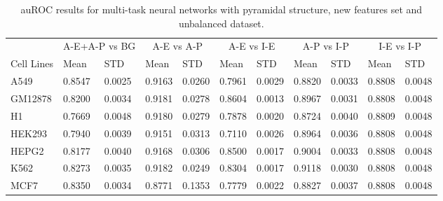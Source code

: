 \begin{table}[!htbp]
\centering
\caption{auROC results for multi-task neural networks with pyramidal structure, new features set and unbalanced dataset.}
\label{tab:newfeatures_auroc}
\hspace*{-2.2cm}
\begin{tabular}[t]{*{11}{l}}
\toprule
 & \multicolumn{2}{c}{A-E+A-P vs BG} & \multicolumn{2}{c}{A-E vs A-P} & \multicolumn{2}{c}{A-E vs I-E} & \multicolumn{2}{c}{A-P vs I-P} & \multicolumn{2}{c}{I-E vs I-P} \\
\cmidrule(lr){2-3}
\cmidrule(lr){4-5}
\cmidrule(lr){6-7}
\cmidrule(lr){8-9}
\cmidrule(lr){10-11}
Cell Lines & Mean & STD & Mean & STD & Mean & STD & Mean & STD & Mean & STD \\
\midrule
A549  & 0.8547 & 0.0025 & 0.9163 & 0.0260 & 0.7961 & 0.0029 & 0.8820 & 0.0033 & 0.8808 & 0.0048\\
GM12878  & 0.8200 & 0.0034 & 0.9181 & 0.0278 & 0.8604 & 0.0013 & 0.8967 & 0.0031 & 0.8808 & 0.0048\\
H1  & 0.7669 & 0.0048 & 0.9180 & 0.0279 & 0.7878 & 0.0020 & 0.8724 & 0.0040 & 0.8809 & 0.0048\\
HEK293  & 0.7940 & 0.0039 & 0.9151 & 0.0313 & 0.7110 & 0.0026 & 0.8964 & 0.0036 & 0.8808 & 0.0048\\
HEPG2  & 0.8177 & 0.0040 & 0.9168 & 0.0306 & 0.8500 & 0.0017 & 0.9004 & 0.0033 & 0.8808 & 0.0048\\
K562  & 0.8273 & 0.0035 & 0.9182 & 0.0249 & 0.8304 & 0.0017 & 0.9118 & 0.0030 & 0.8808 & 0.0048\\
MCF7  & 0.8350 & 0.0034 & 0.8771 & 0.1353 & 0.7779 & 0.0022 & 0.8827 & 0.0037 & 0.8808 & 0.0048\\
\bottomrule
\end{tabular}
\hspace*{-2.2cm}
\end{table}
